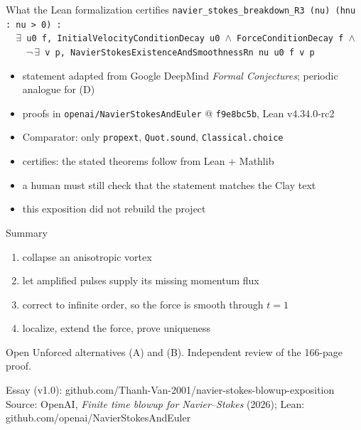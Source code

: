 \documentclass[aspectratio=169,11pt]{beamer}
\begin{document}
\begin{frame}[fragile]{What the Lean formalization certifies}
\small
\texttt{navier\_stokes\_breakdown\_R3 (nu) (hnu : nu > 0) :}\\
\texttt{\ \ $\exists$ u0 f, InitialVelocityConditionDecay u0 $\wedge$ ForceConditionDecay f $\wedge$}\\
\texttt{\ \ \ \ $\neg\,\exists$ v p, NavierStokesExistenceAndSmoothnessRn nu u0 f v p}\\[2mm]
\begin{itemize}
\item statement adapted from Google DeepMind \emph{Formal Conjectures}; periodic analogue for (D)
\item proofs in \texttt{openai/NavierStokesAndEuler} @ \texttt{f9e8bc5b}, Lean v4.34.0-rc2
\item Comparator: only \texttt{propext}, \texttt{Quot.sound}, \texttt{Classical.choice}
\item certifies: the stated theorems follow from Lean + Mathlib
\item a human must still check that the statement matches the Clay text
\item this exposition did not rebuild the project
\end{itemize}
\end{frame}

\begin{frame}{Summary}
\begin{enumerate}
\item collapse an anisotropic vortex
\item let amplified pulses supply its missing momentum flux
\item correct to infinite order, so the force is smooth through $t=1$
\item localize, extend the force, prove uniqueness
\end{enumerate}
\vspace{2mm}
\begin{block}{Open}
Unforced alternatives (A) and (B). Independent review of the 166-page proof.
\end{block}
\vspace{2mm}
\scriptsize Essay (v1.0): github.com/Thanh-Van-2001/navier-stokes-blowup-exposition\\
Source: OpenAI, \emph{Finite time blowup for Navier--Stokes} (2026); Lean: github.com/openai/NavierStokesAndEuler
\end{frame}
\end{document}
